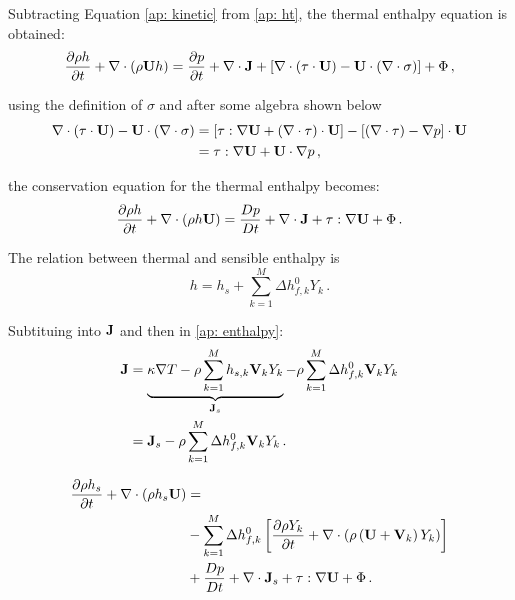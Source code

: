 Subtracting Equation \eqref{ap: kinetic} from \eqref{ap: ht}, the thermal enthalpy equation is obtained:
\begin{equation}\label{ap: h}
 \frac{\partial \rho h}{\partial t} + \nabla \cdot \left( \rho \bv{U} h\right) = \frac{\partial p}{\partial t} + \nabla \cdot \bv{J} +  \left[ \nabla \cdot \left( \tau \cdot \bv{U} \right) - \bv{U} \cdot \left( \nabla \cdot \sigma \right)  \right] + \Phi \, ,
\end{equation}

using the definition of $\sigma$ and after some algebra shown below
\begin{equation}
\begin{split}
 \nabla \cdot \left( \tau \cdot \mathbf{U} \right) - \mathbf{U} \cdot \left( \nabla \cdot \sigma \right) &= \left[ \tau : \nabla \mathbf{U} + \left( \nabla \cdot \tau \right) \cdot  \mathbf{U} \right] - \left[ \left( \nabla \cdot \mathbf{\tau} \right) - \nabla p \right] \cdot \mathbf{U} \\
&= \mathbf{\tau}:\nabla \mathbf{U}+ \mathbf{U} \cdot \nabla p \, ,
\end{split} 
\end{equation}

the conservation equation for the thermal enthalpy becomes:
\begin{equation}\label{ap: enthalpy}
  \frac{\partial \rho h}{\partial t} +  \nabla \cdot \left( \rho h \bv{U} \right) = \frac{Dp}{Dt} + \nabla \cdot \bv{J} +  \bv{\tau} : \nabla\bv{U} + \Phi\, .
\end{equation}

The relation between thermal and sensible enthalpy is
\begin{equation}
 h = h_s+\sum_{k=1}^{M} \Delta h^{0}_{f,k} Y_k \,.
\end{equation}

Subtituing into $\mathbf{J}$ and then in \eqref{ap: enthalpy}:
\begin{equation}
\begin{split}
 \mathbf{J} &=  \underbrace{\kappa \nabla T - \rho \sum_{k=1}^{M} h_{s,k} \mathbf{V}_k Y_k}_{\mathbf{J}_s} - \rho \sum_{k=1}^{M} \Delta h^{0}_{f,k} \mathbf{V}_k Y_k \\
& = \mathbf{J}_s - \rho \sum_{k=1}^{M} \Delta h^{0}_{f,k} \mathbf{V}_k Y_k \, .
\end{split}
\end{equation}

\begin{equation}
\begin{split}
\frac{\partial \rho h_s}{\partial t} +  \nabla \cdot \left( \rho h_s \mathbf{U} \right) &=\\
 &-  \sum_{k=1}^{M} \Delta h^{0}_{f,k} \left[ \frac{\partial \rho Y_k }{\partial t} + \nabla \cdot \left( \rho \left( \mathbf{U} + \mathbf{V}_{k}\right) Y_k \right)  \right]  \\
  &+\frac{Dp}{Dt} + \nabla \cdot \mathbf{J}_s +  \mathbf{\tau} : \nabla\mathbf{U} + \Phi\, .
\end{split}
\end{equation}

